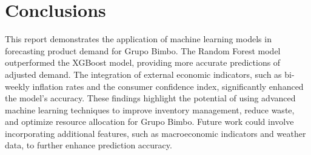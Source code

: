 \documentclass{article}
\begin{document}
\section{Conclusions}
This report demonstrates the application of machine learning models in forecasting product demand for Grupo Bimbo. The Random Forest model outperformed the XGBoost model, providing more accurate predictions of adjusted demand. The integration of external economic indicators, such as bi-weekly inflation rates and the consumer confidence index, significantly enhanced the model's accuracy. These findings highlight the potential of using advanced machine learning techniques to improve inventory management, reduce waste, and optimize resource allocation for Grupo Bimbo. Future work could involve incorporating additional features, such as macroeconomic indicators and weather data, to further enhance prediction accuracy.
\end{document}

